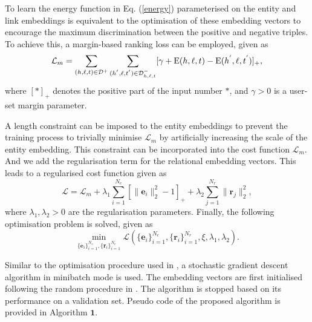 \documentclass[9pt]{sig-alternate-05-2015}
\begin{document}
To learn the energy function in Eq. (\ref{energy}) parameterised on the entity and link embeddings is equivalent to the optimisation of these embedding vectors to encourage the maximum discrimination between  the positive  and negative triples. To achieve this, a margin-based ranking loss can be employed, given as
\begin{equation} \label{loss}
\small
\mathcal{L}_m = \sum_{(h,\ell,t)\in \mathcal{D}^+} \sum_{(h^{'},\ell,t^{'})\in  \mathcal{D}^{-}_{h,\ell,t}} [\gamma + \mathrm{E}(h,\ell,t)- \mathrm{E}(h^{'},\ell,t^{'}) ]_+,
\end{equation}
where $[*]_+$ denotes the positive part of the input number $*$, and $\gamma > 0$ is a user-set margin parameter.

A length constraint can be imposed to the entity embeddings to prevent the training process to trivially minimise $\mathcal{L}_m$ by artificially increasing the scale of the entity embedding. This constraint can be incorporated into the cost function $\mathcal{L}_m$.  And we add the regularisation term  for the relational embedding vectors. This leads to a regularised cost function given as
\begin{equation} \label{loss2}
\mathcal{L} = \mathcal{L}_m  +\lambda_1 \sum_{i =1}^{N_e} \left[\|\bm{e}_i\|_2^2 - 1\right]_+ + \lambda_2 \sum_{j=1}^{N_r} \| \bm{r}_{j} \|_2^2,
\end{equation}
where $\lambda_1, \lambda_2 >0$ are the regularisation parameters. Finally, the  following optimisation problem is solved, given as
\begin{equation}
\min_{\{\bm e_i\}_{i=1}^{N_e}, \{\bm r_i\}_{i=1}^{N_r}} \mathcal{L}\left(\{\bm e_i\}_{i=1}^{N_e}, \{\bm r_i\}_{i=1}^{N_r}, \xi,\lambda_1, \lambda_2 \right).
\end{equation}

Similar to the optimisation procedure used in \cite{bordes_translating_2013}, a stochastic gradient descent algorithm in minibatch mode is used. The embedding vectors are first initialised following the random procedure in \cite{glorot_understanding_2010}. The algorithm is stopped based on its performance on a validation set.  Pseudo code of the proposed algorithm is provided in Algorithm $\textbf{1}$.
\end{document}
